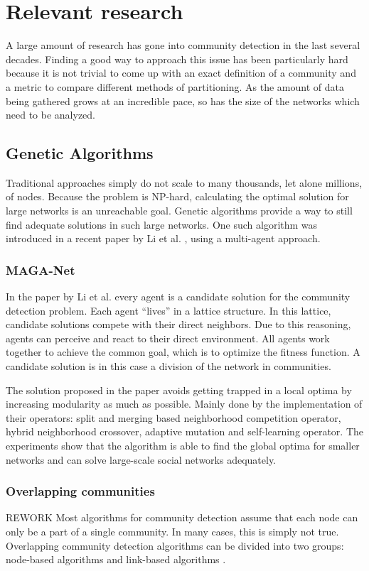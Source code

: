 \section{Relevant research}
\label{sec:relevantResearch}
A large amount of research has gone into community detection in the last several decades. 
Finding a good way to approach this issue has been particularly hard because it is not trivial to come up with an exact definition of a community and a metric to compare different methods of partitioning. 
As the amount of data being gathered grows at an incredible pace, so has the size of the networks which need to be analyzed. \\

\subsection{Genetic Algorithms}
Traditional approaches simply do not scale to many thousands, let alone millions, of nodes. 
Because the problem is NP-hard, calculating the optimal solution for large networks is an unreachable goal.
Genetic algorithms provide a way to still find adequate solutions in such large networks. 
One such algorithm was introduced in a recent paper by Li et al. \cite{Li2016}, using a multi-agent approach. 

\subsubsection{MAGA-Net}
In the paper by Li et al. \cite{Li2016} every agent is a candidate solution for the community detection problem.
Each agent ``lives'' in a lattice structure. 
In this lattice, candidate solutions compete with their direct neighbors.
Due to this reasoning, agents can perceive and react to their direct environment.
All agents work together to achieve the common goal, which is to optimize the fitness function.
A candidate solution is in this case a division of the network in communities.

The solution proposed in the paper avoids getting trapped in a local optima by increasing modularity as much as possible.
Mainly done by the implementation of their operators: split and merging based neighborhood competition operator, hybrid neighborhood crossover, adaptive mutation and self-learning operator.
The experiments show that the algorithm is able to find the global optima for smaller networks and can solve large-scale social networks adequately.

\subsubsection{Overlapping communities}
REWORK
Most algorithms for community detection assume that each node can only be a part of a single community. 
In many cases, this is simply not true. 
Overlapping community detection algorithms can be divided into two groups: node-based algorithms and link-based algorithms \cite{Shi2013}.\\

